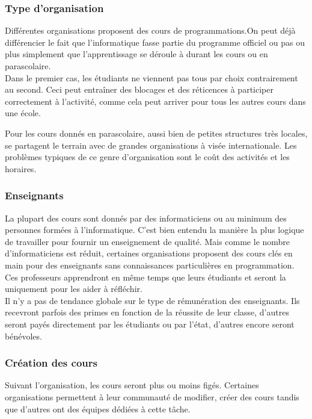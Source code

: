 \subsubsection{Type d'organisation}
Différentes organisations proposent des cours de programmations.On peut déjà différencier le fait que l'informatique fasse partie du programme officiel ou pas ou plus simplement que l'apprentissage se déroule à durant les cours ou en parascolaire.\\

Dans le premier cas, les étudiants ne viennent pas tous par choix contrairement au second. Ceci peut entraîner des blocages et des réticences à participer correctement à l'activité, comme cela peut arriver pour tous les autres cours dans une école.

Pour les cours donnés en parascolaire, aussi bien de petites structures très locales, se partagent le terrain avec de grandes organisations à visée internationale. Les problèmes typiques de ce genre d'organisation sont le coût des activités et les horaires.

\subsubsection{Enseignants}
La plupart des cours sont donnés par des informaticiens ou au minimum des personnes formées à l'informatique. C'est bien entendu la manière la plus logique de travailler pour fournir un enseignement de qualité. Mais comme le nombre d'informaticiens est réduit, certaines organisations proposent des cours clés en main pour des enseignants sans connaissances particulières en programmation. Ces professeurs apprendront en même temps que leurs étudiants et seront la uniquement pour les aider à réfléchir.\\

Il n'y a pas de tendance globale sur le type de rémunération des enseignants. Ils recevront parfois des primes en fonction de la réussite de leur classe, d'autres seront payés directement par les étudiants ou par l'état, d'autres encore seront bénévoles.

\subsubsection{Création des cours}
Suivant l'organisation, les cours seront plus ou moins figés. Certaines organisations permettent à leur communauté de modifier, créer des cours tandis que d'autres ont des équipes dédiées à cette tâche.

